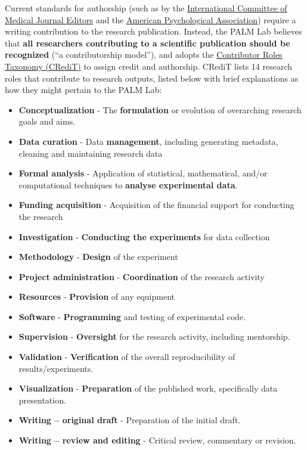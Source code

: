 \documentclass[
]{book}
\providecommand{\tightlist}{%
  \setlength{\itemsep}{0pt}\setlength{\parskip}{0pt}}
\begin{document}
Current standards for authorship (such as by the \href{https://www.icmje.org/recommendations/browse/roles-and-responsibilities/defining-the-role-of-authors-and-contributors.html}{International Committee of Medical Journal Editors} and the \href{https://www.apa.org/research/responsible/publication}{American Psychological Association}) require a writing contribution to the research publication. Instead, the PALM Lab believes that \textbf{all researchers contributing to a scientific publication should be recognized} (``a contributorship model''), and adopts the \href{https://credit.niso.org/}{Contributor Roles Taxonomy (CRediT)} to assign credit and authorship. CRediT lists 14 research roles that contribute to research outputs, listed below with brief explanations as how they might pertain to the PALM Lab:

\begin{itemize}
\tightlist
\item
  \textbf{Conceptualization} - The \textbf{formulation} or evolution of overarching research goals and aims.
\item
  \textbf{Data curation} - Data \textbf{management}, including generating metadata, cleaning and maintaining research data
\item
  \textbf{Formal analysis} - Application of statistical, mathematical, and/or computational techniques to \textbf{analyse experimental data}.
\item
  \textbf{Funding acquisition} - Acquisition of the financial support for conducting the research
\item
  \textbf{Investigation} - \textbf{Conducting the experiments} for data collection
\item
  \textbf{Methodology} - \textbf{Design} of the experiment
\item
  \textbf{Project administration} - \textbf{Coordination} of the research activity
\item
  \textbf{Resources} - \textbf{Provision} of any equipment
\item
  \textbf{Software} - \textbf{Programming} and testing of experimental code.
\item
  \textbf{Supervision} - \textbf{Oversight} for the research activity, including mentorship.
\item
  \textbf{Validation} - \textbf{Verification} of the overall reproducibility of results/experiments.
\item
  \textbf{Visualization} - \textbf{Preparation} of the published work, specifically data presentation.
\item
  \textbf{Writing -- original draft} - Preparation of the initial draft.
\item
  \textbf{Writing -- review and editing} - Critical review, commentary or revision.
\end{itemize}
\end{document}
